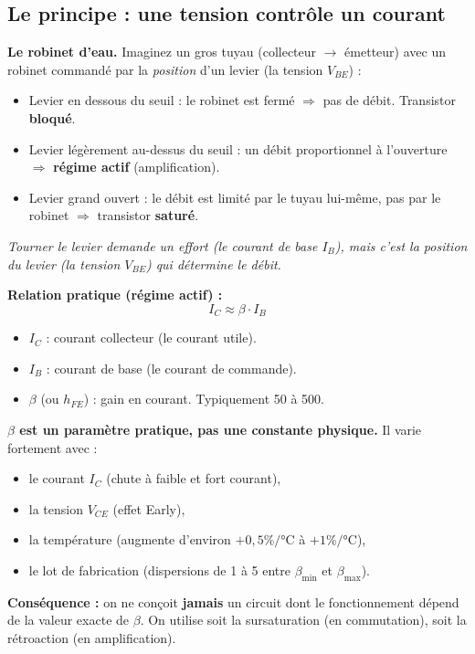 \documentclass[12pt,a4paper,twoside]{book}
\begin{document}
\subsection{Le principe : une tension contrôle un courant}

\begin{analogie}
\textbf{Le robinet d'eau.} Imaginez un gros tuyau (collecteur $\to$ émetteur) avec un robinet commandé par la \textit{position} d'un levier (la tension $V_{BE}$) :
\begin{itemize}[nosep]
\item Levier en dessous du seuil : le robinet est fermé $\Rightarrow$ pas de débit. Transistor \textbf{bloqué}.
\item Levier légèrement au-dessus du seuil : un débit proportionnel à l'ouverture $\Rightarrow$ \textbf{régime actif} (amplification).
\item Levier grand ouvert : le débit est limité par le tuyau lui-même, pas par le robinet $\Rightarrow$ transistor \textbf{saturé}.
\end{itemize}
\textit{Tourner le levier demande un effort (le courant de base $I_B$), mais c'est la position du levier (la tension $V_{BE}$) qui détermine le débit.}
\end{analogie}

\begin{formule}
\textbf{Relation pratique (régime actif) :}
\[
\boxed{I_C \approx \beta \cdot I_B}
\]
\begin{itemize}[nosep]
\item $I_C$ : courant collecteur (le courant utile).
\item $I_B$ : courant de base (le courant de commande).
\item $\beta$ (ou $h_{FE}$) : gain en courant. Typiquement 50 à 500.
\end{itemize}
\end{formule}

\begin{attention}
\textbf{$\beta$ est un paramètre pratique, pas une constante physique.} Il varie fortement avec :
\begin{itemize}[nosep]
\item le courant $I_C$ (chute à faible et fort courant),
\item la tension $V_{CE}$ (effet Early),
\item la température (augmente d'environ $+0{,}5\%/°$C à $+1\%/°$C),
\item le lot de fabrication (dispersions de 1 à 5 entre $\beta_{\min}$ et $\beta_{\max}$).
\end{itemize}
\textbf{Conséquence :} on ne conçoit \textbf{jamais} un circuit dont le fonctionnement dépend de la valeur exacte de $\beta$. On utilise soit la sursaturation (en commutation), soit la rétroaction (en amplification).
\end{attention}
\end{document}
